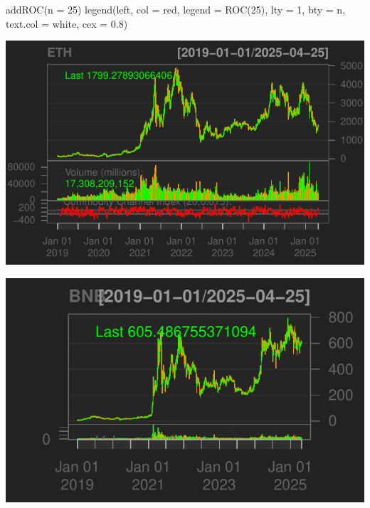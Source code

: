\documentclass[]{tufte-handout}
\newenvironment{Shaded}{}{}
\newcommand{\AttributeTok}[1]{\textcolor[rgb]{0.49,0.56,0.16}{#1}}
\newcommand{\DecValTok}[1]{\textcolor[rgb]{0.25,0.63,0.44}{#1}}
\newcommand{\FloatTok}[1]{\textcolor[rgb]{0.25,0.63,0.44}{#1}}
\newcommand{\FunctionTok}[1]{\textcolor[rgb]{0.02,0.16,0.49}{#1}}
\newcommand{\NormalTok}[1]{#1}
\newcommand{\OtherTok}[1]{\textcolor[rgb]{0.00,0.44,0.13}{#1}}
\newcommand{\SpecialCharTok}[1]{\textcolor[rgb]{0.25,0.44,0.63}{#1}}
\newcommand{\StringTok}[1]{\textcolor[rgb]{0.25,0.44,0.63}{#1}}
\begin{document}
\begin{Shaded}
\begin{Highlighting}[]
\FunctionTok{addROC}\NormalTok{(}\AttributeTok{n =} \DecValTok{25}\NormalTok{)}
\FunctionTok{legend}\NormalTok{(}\StringTok{\textquotesingle{}left\textquotesingle{}}\NormalTok{, }\AttributeTok{col =} \StringTok{\textquotesingle{}red\textquotesingle{}}\NormalTok{, }\AttributeTok{legend =} \StringTok{\textquotesingle{}ROC(25)\textquotesingle{}}\NormalTok{, }\AttributeTok{lty =} \DecValTok{1}\NormalTok{, }\AttributeTok{bty =} \StringTok{\textquotesingle{}n\textquotesingle{}}\NormalTok{,}
       \AttributeTok{text.col =} \StringTok{\textquotesingle{}white\textquotesingle{}}\NormalTok{, }\AttributeTok{cex =} \FloatTok{0.8}\NormalTok{)}
\end{Highlighting}
\end{Shaded}

\includegraphics{cripto_update_files/figure-latex/unnamed-chunk-11-4}

\begin{Shaded}
\end{Shaded}

\includegraphics{cripto_update_files/figure-latex/unnamed-chunk-11-5}
\end{document}
